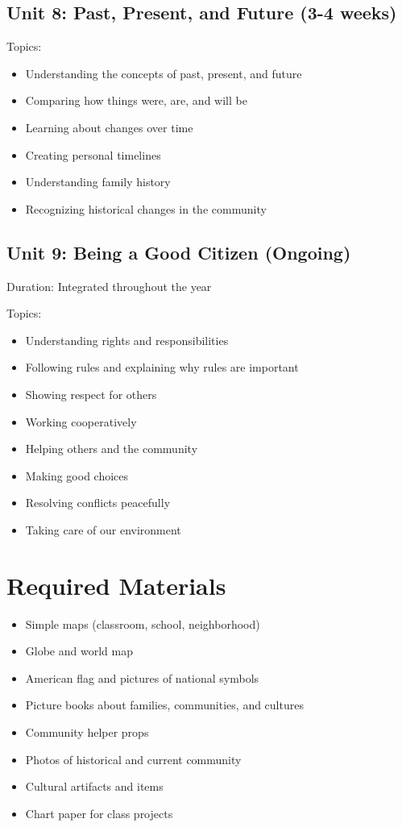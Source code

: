 \documentclass[11pt,letterpaper]{report}
\begin{document}
\subsection{Unit 8: Past, Present, and Future (3-4 weeks)}

Topics:
\begin{itemize}
\item Understanding the concepts of past, present, and future
\item Comparing how things were, are, and will be
\item Learning about changes over time
\item Creating personal timelines
\item Understanding family history
\item Recognizing historical changes in the community
\end{itemize}

\subsection{Unit 9: Being a Good Citizen (Ongoing)}

Duration: Integrated throughout the year

Topics:
\begin{itemize}
\item Understanding rights and responsibilities
\item Following rules and explaining why rules are important
\item Showing respect for others
\item Working cooperatively
\item Helping others and the community
\item Making good choices
\item Resolving conflicts peacefully
\item Taking care of our environment
\end{itemize}

\section{Required Materials}

\begin{itemize}
\item Simple maps (classroom, school, neighborhood)
\item Globe and world map
\item American flag and pictures of national symbols
\item Picture books about families, communities, and cultures
\item Community helper props
\item Photos of historical and current community
\item Cultural artifacts and items
\item Chart paper for class projects
\end{itemize}
\end{document}

